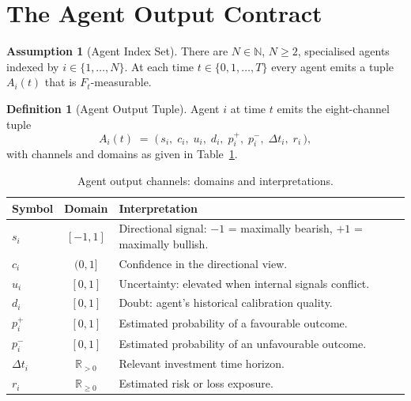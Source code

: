 \documentclass[12pt,openany]{book}
\newcommand{\calF}{\mathcal{F}}
\numberwithin{equation}{chapter}
\theoremstyle{plain}
\theoremstyle{definition}
\newtheorem{definition}[theorem]{Definition}
\newtheorem{assumption}[theorem]{Assumption}
\theoremstyle{remark}
\def\mathcal#1{#1}%
\begin{document}
\section{The Agent Output Contract}

\begin{assumption}[Agent Index Set]
\label{asm:agent-index}
There are $N \in \mathbb{N}$, $N \geq 2$, specialised agents
indexed by $i \in \{1,\ldots,N\}$.  At each time
$t \in \{0,1,\ldots,T\}$ every agent emits a tuple
$\mathcal{A}_i(t)$ that is $\calF_t$-measurable.
\end{assumption}

\begin{definition}[Agent Output Tuple]
\label{def:agent-output}
Agent $i$ at time $t$ emits the eight-channel tuple
\begin{equation}
  \mathcal{A}_i(t)
  \;=\;
  \bigl(\,s_i,\; c_i,\; u_i,\; d_i,\;
         p_i^{+},\; p_i^{-},\; \Delta t_i,\; r_i\,\bigr),
  \label{eq:agent-tuple}
\end{equation}
with channels and domains as given in Table~\ref{tab:channels}.
\end{definition}

\begin{table}[H]
\centering
\caption{Agent output channels: domains and interpretations.}
\label{tab:channels}
\small
\begin{tabularx}{\linewidth}{@{} l c X @{}}
\toprule
\textbf{Symbol} & \textbf{Domain} & \textbf{Interpretation} \\
\midrule
$s_i$ & $[-1,1]$ & Directional signal: $-1$ = maximally bearish,
  $+1$ = maximally bullish. \\
$c_i$ & $(0,1]$ & Confidence in the directional view. \\
$u_i$ & $[0,1]$ & Uncertainty: elevated when internal signals conflict. \\
$d_i$ & $[0,1]$ & Doubt: agent's historical calibration quality. \\
$p_i^+$ & $[0,1]$ & Estimated probability of a favourable outcome. \\
$p_i^-$ & $[0,1]$ & Estimated probability of an unfavourable outcome. \\
$\Delta t_i$ & $\mathbb{R}_{>0}$ & Relevant investment time horizon. \\
$r_i$ & $\mathbb{R}_{\geq 0}$ & Estimated risk or loss exposure. \\
\bottomrule
\end{tabularx}
\end{table}
\end{document}
